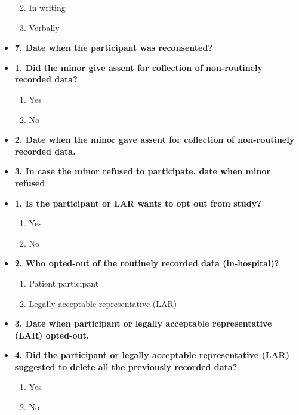 \documentclass[
]{scrartcl}
\providecommand{\tightlist}{%
  \setlength{\itemsep}{0pt}\setlength{\parskip}{0pt}}\usepackage{longtable,booktabs,array}
\begin{document}
\begin{itemize}
  \begin{enumerate}
  \def\labelenumi{\arabic{enumi}.}
  \tightlist
  \item
    In writing
  \item
    Verbally
  \end{enumerate}
\item
  \textbf{7. Date when the participant was reconsented?}
\item
  \textbf{1. Did the minor give assent for collection of non-routinely
  recorded data?}

  \begin{enumerate}
  \def\labelenumi{\arabic{enumi}.}
  \tightlist
  \item
    Yes
  \item
    No
  \end{enumerate}
\item
  \textbf{2. Date when the minor gave assent for collection of
  non-routinely recorded data.}
\item
  \textbf{3. In case the minor refused to participate, date when minor
  refused}
\item
  \textbf{1. Is the participant or LAR wants to opt out from study?}

  \begin{enumerate}
  \def\labelenumi{\arabic{enumi}.}
  \tightlist
  \item
    Yes
  \item
    No
  \end{enumerate}
\item
  \textbf{2. Who opted-out of the routinely recorded data
  (in-hospital)?}

  \begin{enumerate}
  \def\labelenumi{\arabic{enumi}.}
  \tightlist
  \item
    Patient participant
  \item
    Legally acceptable representative (LAR)
  \end{enumerate}
\item
  \textbf{3. Date when participant or legally acceptable representative
  (LAR) opted-out.}
\item
  \textbf{4. Did the participant or legally acceptable representative
  (LAR) suggested to delete all the previously recorded data?}

  \begin{enumerate}
  \def\labelenumi{\arabic{enumi}.}
  \tightlist
  \item
    Yes
  \item
    No
  \end{enumerate}
\end{itemize}
\end{document}
